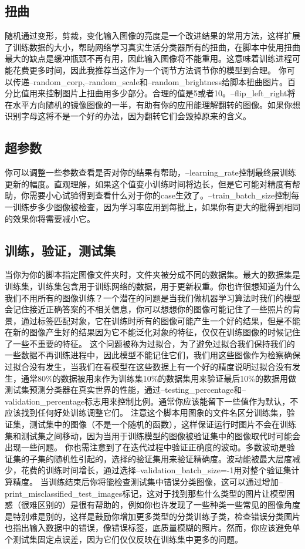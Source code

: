 \subsection{扭曲}
随机通过变形，剪裁，变化输入图像的亮度是一个改进结果的常用方法，这样扩展了训练数据的大小，帮助网络学习真实生活分类器所有的扭曲，在脚本中使用扭曲最大的缺点是缓冲瓶颈不再有用，因此输入图像将不能重用。这意味着训练进程可能花费更多时间，因此我推荐当这作为一个调节方法调节你的模型到合理。
你可以传递--random\_corp,--random\_scale和--random\_brightness给脚本扭曲图片。百分比值用来控制图片上扭曲用多少部分。合理的值是5或者10。--flip\_left\_right将在水平方向随机的镜像图像的一半，有助有你的应用能理解翻转的图像。如果你想识别字母这将不是一个好的办法，因为翻转它们会毁掉原来的含义。
\subsection{超参数}
你可以调整一些参数查看是否对你的结果有帮助，--learning\_rate控制最终层训练更新的幅度。直观理解，如果这个值变小训练时间将边长，但是它可能对精度有帮助，你需要小心试验得到查看什么对于你的case生效了。--train\_batch\_size控制每一训练步多少图像被检查，因为学习率应用到每批上，如果你有更大的批得到相同的效果你将需要减小它。
\subsection{训练，验证，测试集}
当你为你的脚本指定图像文件夹时，文件夹被分成不同的数据集。最大的数据集是训练集，训练集包含用于训练网络的数据，用于更新权重。你也许很想知道为什么我们不用所有的图像训练？一个潜在的问题是当我们做机器学习算法时我们的模型会记住接近正确答案的不相关信息，你可以想想你的图像可能记住了一些照片的背景，通过标签匹配对象，它在训练时所有的图像可能产生一个好的结果，但是不能在新的图像产生好的结果因为它不能泛化对象的特征，仅仅在训练图像的时候记住了一些不重要的特征。
这个问题被称为过拟合，为了避免过拟合我们保持我们的一些数据不再训练进程中，因此模型不能记住它们，我们用这些图像作为检察确保过拟合没有发生，当我们在看模型在这些数据上有一个好的精度说明过拟合没有发生，通常80\%的数据被用来作为训练集10\%的数据集用来验证最后10\%的数据用做测试集预测分类器在真实世界的性能，通过--testing\_percentage和--validation\_percentage标志用来控制比例。通常你应该能留下一些值作为默认，不应该找到任何好处训练调整它们。
注意这个脚本用图象的文件名区分训练集，验证集，测试集中的图像（不是一个随机的函数），这样保证运行时图片不会在训练集和测试集之间移动，因为当用于训练模型的图像被验证集中的图像取代时可能会出现一些问题。
你也需注意到了在迭代过程中验证正确度的波动。多数波动是验证集的子集的随机性引起的，选择的验证集用来验证精确度。波动能被最大层度减少，花费的训练时间增长，通过选择--validation\_batch\_size=-1用对整个验证集计算精度。
当训练结束后你将能检查测试集中错误分类图像，这可以通过增加--print\_misclassified\_test\_images标记，这对于找到那些什么类型的图片让模型困惑（很难区别的）是很有帮助的，例如你也许发现了一些种类一些常见的图像角度是特别难是别的，这样是鼓励你增加更多类型的分类训练子类，检查错误分类图片也指出输入数据中的错误，像错误标签，底质量模糊的照片。然而，你应该避免单个测试集固定点误差，因为它们仅仅反映在训练集中更多的问题。
